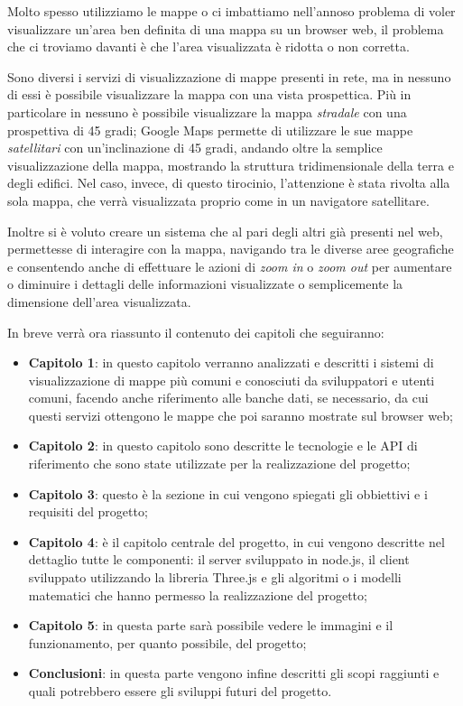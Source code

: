 Molto spesso utilizziamo le mappe o ci imbattiamo nell'annoso problema di voler visualizzare un'area ben definita di una mappa su un browser web, il problema che ci troviamo davanti è che l'area visualizzata è ridotta o non corretta. 

Sono diversi i servizi di visualizzazione di mappe presenti in rete, ma in nessuno di essi è possibile visualizzare la mappa con una vista prospettica. Più in particolare in nessuno è possibile visualizzare la mappa \textit{stradale} con una prospettiva di 45 gradi; Google Maps permette di utilizzare le sue mappe \textit{satellitari} con un'inclinazione di 45 gradi, andando oltre la semplice visualizzazione della mappa, mostrando la struttura tridimensionale della terra e degli edifici. Nel caso, invece, di questo tirocinio, l'attenzione è stata rivolta alla sola mappa, che verrà visualizzata proprio come in un navigatore satellitare.

Inoltre si è voluto creare un sistema che al pari degli altri già presenti nel web, permettesse di interagire con la mappa, navigando tra le diverse aree geografiche e consentendo anche di effettuare le azioni di \textit{zoom in} o \textit{zoom out} per aumentare o diminuire i dettagli delle informazioni visualizzate o semplicemente la dimensione dell'area visualizzata.

In breve verrà ora riassunto il contenuto dei capitoli che seguiranno:
\begin{itemize}
	\item \textbf{Capitolo 1}: in questo capitolo verranno analizzati e descritti i sistemi di visualizzazione di mappe più comuni e conosciuti da sviluppatori e utenti comuni, facendo anche riferimento alle banche dati, se necessario, da cui questi servizi ottengono le mappe che poi saranno mostrate sul browser web;
	\item \textbf{Capitolo 2}: in questo capitolo sono descritte le tecnologie e le API di riferimento che sono state utilizzate per la realizzazione del progetto;
	\item \textbf{Capitolo 3}: questo è la sezione in cui vengono spiegati gli obbiettivi e i requisiti del progetto;
	\item \textbf{Capitolo 4}: è il capitolo centrale del progetto, in cui vengono descritte nel dettaglio tutte le componenti: il server sviluppato in node.js, il client sviluppato utilizzando la libreria Three.js e gli algoritmi o i modelli matematici che hanno permesso la realizzazione del progetto;
	\item \textbf{Capitolo 5}: in questa parte sarà possibile vedere le immagini e il funzionamento, per quanto possibile, del progetto;
	\item \textbf{Conclusioni}: in questa parte vengono infine descritti gli scopi raggiunti e quali potrebbero essere gli sviluppi futuri del progetto.
\end{itemize}